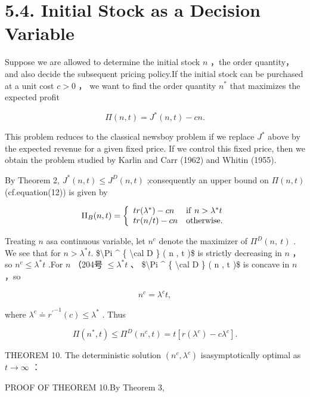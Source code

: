 \section{5.4. Initial Stock as a Decision
Variable}\label{initial-stock-as-a-decision-variable}

Suppose we are allowed to determine the initial stock \(n\) ，the order
quantity，and also decide the subsequent pricing policy.If the initial
stock can be purchased at a unit cost \(c > 0\) ， we want to find the
order quantity \(n ^ { * }\) that maximizes the expected profit

\[
\Pi ( n , t ) = J ^ { * } ( n , t ) - c n .
\]

This problem reduces to the classical newsboy problem if we replace
\(J ^ { * }\) above by the expected revenue for a given fixed price. If
we control this fixed price, then we obtain the problem studied by
Karlin and Carr (1962) and Whitin (1955).

By Theorem 2, \(J ^ { * } ( n , t ) \leq J ^ { D } ( n , t )\)
;consequently an upper bound on \(\Pi ( n , t )\) (cf.equation(12)) is
given by

\[
\Pi _ { B } ( n , t ) = { \left\{ \begin{array} { l l } { t r ( \lambda ^ { * } ) - c n } & { { \mathrm { i f ~ } } n > \lambda ^ { * } t } \\ { t r ( n / t ) - c n } & { { \mathrm { o t h e r w i s e . } } } \end{array} \right. }
\]

Treating \(n\) asa continuous variable, let \(n ^ { c }\) denote the
maximizer of \(\Pi ^ { D } ( n , \ t )\) . We see that for
\(n > \lambda ^ { * } t .\) {\$\textbackslash Pi \^{} \{
\textbackslash cal D \} ( n , t )\$} is strictly decreasing in \(n\)
，so \(n ^ { c } \leq \lambda ^ { * } t\) .For \(n\) （204号
\(\leq \lambda ^ { * } t\) 、 {\$\textbackslash Pi \^{} \{
\textbackslash cal D \} ( n , t )\$} is concave in \(n\) ，so

\[
n ^ { c } = \lambda ^ { c } t ,
\]

where
\(\lambda ^ { c } \doteq { r ^ { \prime } } ^ { - 1 } ( c ) \le \lambda ^ { * }\)
. Thus

\[
\Pi ( n ^ { * } , t ) \leq \Pi ^ { D } ( n ^ { c } , t ) = t [ r ( \lambda ^ { c } ) - c \lambda ^ { c } ] .
\]

THEOREM 10. The deterministic solution
\(( n ^ { c } , \lambda ^ { c } )\) isasymptotically optimal as
\(t \to \infty\) ：

PROOF OF THEOREM 10.By Theorem 3,

